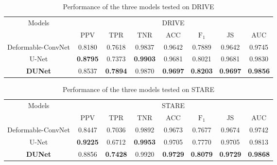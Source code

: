 \documentclass[journal]{IEEEtran}
\begin{document}
\begin{table}[]
\caption{Performance of the three models tested on DRIVE}
\renewcommand\arraystretch{1.3}      
\renewcommand\tabcolsep{1.5pt} 
\begin{center}
\begin{tabular}{cccccccc}
\toprule
\multirow{2}{*}{Models} & \multicolumn{7}{c}{DRIVE}                                                                                                  \\ \cline{2-8} 
                        & PPV             & TPR             & TNR             & ACC             & $\mathrm{F_{1}}$              & JS              & AUC             \\ \hline
Deformable-ConvNet      & 0.8180           & 0.7618          & 0.9837          & 0.9642          & 0.7889          & 0.9642          & 0.9745          \\
U-Net                   & \textbf{0.8795} & 0.7373          & \textbf{0.9903} & 0.9681          & 0.8021          & 0.9681          & 0.9830           \\ 
\textbf{DUNet}                   & 0.8537          & \textbf{0.7894} & 0.9870           & \textbf{0.9697} & \textbf{0.8203} & \textbf{0.9697} & \textbf{0.9856} \\
\bottomrule 
\end{tabular}
\end{center}
\label{table:DRIVE_performance}
\end{table}


\begin{table}[]
\caption{Performance of the three models tested on STARE}
\renewcommand\arraystretch{1.3}      
\renewcommand\tabcolsep{1.5pt} 
\begin{center}
\begin{tabular}{cccccccc}
\toprule
\multirow{2}{*}{Models} & \multicolumn{7}{c}{STARE}                                                                                                  \\ \cline{2-8} 
                        & PPV             & TPR             & TNR             & ACC             & $\mathrm{F_{1}}$              & JS              & AUC             \\ \hline
Deformable-ConvNet      & 0.8447          & 0.7036          & 0.9892          & 0.9673          & 0.7677          & 0.9674          & 0.9742          \\ 
U-Net                   & \textbf{0.9225} & 0.6712          & \textbf{0.9953} & 0.9705          & 0.7770          & 0.9705          & 0.9813          \\
\textbf{DUNet}                   & 0.8856          & \textbf{0.7428} & 0.9920          & \textbf{0.9729} & \textbf{0.8079} & \textbf{0.9729} & \textbf{0.9868} \\
\bottomrule
\end{tabular}
\end{center}
\label{table:STARE_performance}
\end{table}
\end{document}

